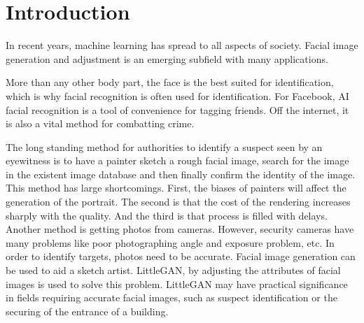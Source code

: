 \section{Introduction}
In recent years, machine learning has spread to all aspects of society.
Facial image generation and adjustment is an emerging subfield with many applications.


More than any other body part, the face is the best suited for identification,
    which is why facial recognition is often used for identification.
For Facebook, AI facial recognition is a tool of convenience for tagging friends.
Off the internet, it is also a vital method for combatting crime.




The long standing method for authorities to identify a suspect seen by an eyewitness is to have a painter sketch a rough facial image,
    search for the image in the existent image database and then finally confirm the identity of the image.
This method has large shortcomings.
First, the biases of painters will affect the generation of the portrait.
The second is that the cost of the rendering increases sharply with the quality.
And the third is that process is filled with delays.
Another method is getting photos from cameras.
However, security cameras have many problems like poor photographing angle and exposure problem, etc.
In order to identify targets, photos need to be accurate.
Facial image generation can be used to aid a sketch artist.
LittleGAN, by adjusting the attributes of facial images is used to solve this problem.
LittleGAN may have practical significance in fields requiring accurate facial images,
    such as suspect identification or the securing of the entrance of a building.